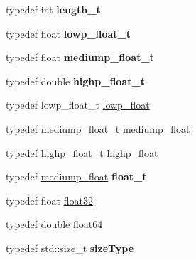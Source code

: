 \begin{DoxyCompactItemize}
\item 
typedef int {\bfseries length\+\_\+t}\hypertarget{namespaceglm_a090a0de2260835bee80e71a702492ed9}{}\label{namespaceglm_a090a0de2260835bee80e71a702492ed9}

\item 
typedef float {\bfseries lowp\+\_\+float\+\_\+t}\hypertarget{namespaceglm_a0a43b64238afac063f27ee7620205bf2}{}\label{namespaceglm_a0a43b64238afac063f27ee7620205bf2}

\item 
typedef float {\bfseries mediump\+\_\+float\+\_\+t}\hypertarget{namespaceglm_aec127979a2b6edbf05b485cb4e8c47cc}{}\label{namespaceglm_aec127979a2b6edbf05b485cb4e8c47cc}

\item 
typedef double {\bfseries highp\+\_\+float\+\_\+t}\hypertarget{namespaceglm_af6f4e45ae06ae3f979dd30cafe7d07c6}{}\label{namespaceglm_af6f4e45ae06ae3f979dd30cafe7d07c6}

\item 
typedef lowp\+\_\+float\+\_\+t \hyperlink{group__core__precision_ga2887fbc729ac5c1c5caeb7cd57a7145c}{lowp\+\_\+float}
\item 
typedef mediump\+\_\+float\+\_\+t \hyperlink{group__core__precision_gac785826c039fe6c97c03b37c81c1a68e}{mediump\+\_\+float}
\item 
typedef highp\+\_\+float\+\_\+t \hyperlink{group__core__precision_ga3d443a093adc053638ed7f81c5bfe300}{highp\+\_\+float}
\item 
typedef \hyperlink{group__core__precision_gac785826c039fe6c97c03b37c81c1a68e}{mediump\+\_\+float} {\bfseries float\+\_\+t}
\item 
typedef float \hyperlink{group__gtc__type__precision_ga814f2f65354b6588b067cc5c67a6b340}{float32}
\item 
typedef double \hyperlink{group__gtc__type__precision_gab721f828b41f46b20cf4883b50733d3b}{float64}
\item 
typedef std\+::size\+\_\+t {\bfseries size\+Type}\hypertarget{namespaceglm_ae49d80f7bfe4be96585fe8f1d3431cc6}{}\label{namespaceglm_ae49d80f7bfe4be96585fe8f1d3431cc6}


\end{DoxyCompactItemize}
